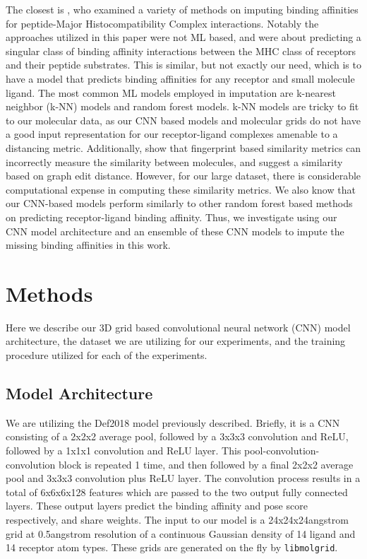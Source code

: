 \documentclass[journal=jmcmar,manuscript=article]{achemso}
\begin{document}
The closest is \citet{peptideMHCimp}, who examined a variety of methods on imputing binding affinities for peptide-Major Histocompatibility Complex interactions.
Notably the approaches utilized in this paper were not ML based, and were about predicting a singular class of binding affinity interactions between the MHC class of receptors and their peptide substrates.\cite{peptideMHCimp}
This is similar, but not exactly our need, which is to have a model that predicts binding affinities for any receptor and small molecule ligand.
The most common ML models employed in imputation are k-nearest neighbor (k-NN) models and random forest models.\cite{review2}
k-NN models are tricky to fit to our molecular data, as our CNN based models and molecular grids do not have a good input representation for our receptor-ligand complexes amenable to a distancing metric.
Additionally, \citet{graphEditDist} show that fingerprint based similarity metrics can incorrectly measure the similarity between molecules, and suggest a similarity based on graph edit distance.
However, for our large dataset, there is considerable computational expense in computing these similarity metrics. 
We also know that our CNN-based models perform similarly to other random forest based methods on predicting receptor-ligand binding affinity.\cite{crossdocked2020}
Thus, we investigate using our CNN model architecture and an ensemble of these CNN models to impute the missing binding affinities in this work.

\section{Methods}
Here we describe our 3D grid based convolutional neural network (CNN) model architecture, the dataset we are utilizing for our experiments, and the training procedure utilized for each of the experiments.

\subsection{Model Architecture}
We are utilizing the Def2018 model previously described.\cite{crossdocked2020}
Briefly, it is a CNN consisting of a 2x2x2 average pool, followed by a 3x3x3 convolution and ReLU, followed by a 1x1x1 convolution and ReLU layer. 
This pool-convolution-convolution block is repeated 1 time, and then followed by a final 2x2x2 average pool and 3x3x3 convolution plus ReLU layer.
The convolution process results in a total of 6x6x6x128 features which are passed to the two output fully connected layers.
These output layers predict the binding affinity and pose score respectively, and share weights.
The input to our model is a 24x24x24angstrom grid at 0.5angstrom resolution of a continuous Gaussian density of 14 ligand and 14 receptor atom types.
These grids are generated on the fly by \texttt{libmolgrid}.\cite{sunseri2019libmolgrid}
\end{document}
